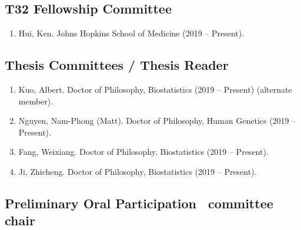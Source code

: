 \documentclass[10pt]{article}
\newcommand{\dn}[1]{{\color{black} {#1}}}
\newcommand{\myben}[1]{\smallskip\begin{enumerate}[start=1,label={\scriptsize \arabic*$\ $},leftmargin=\parindent]\setlength{\itemsep}{#1}\vspace*{-0.7em}}
\newcommand{\ee}{\end{enumerate}}
\newcommand{\mylift}[1]{\vspace*{#1}}
\begin{document}









\mylift{-1.5em}

\subsection*{T32 Fellowship Committee}

\myben{-0.1em}

\item Hui, Ken. Johns Hopkins School of Medicine (2019 -- Present).

\ee

\mylift{-1.5em}

\subsection*{Thesis Committees / Thesis Reader}

\myben{-0.1em}

\item \dn{Kuo}, Albert. Doctor of Philosophy, Biostatistics (2019 -- Present) (alternate member).
\item \dn{Nguyen}, Nam-Phong (Matt). Doctor of Philosophy, Human Genetics (2019 -- Present).
\item \dn{Fang}, Weixiang. Doctor of Philosophy, Biostatistics (2019 -- Present).
\item \dn{Ji}, Zhicheng. Doctor of Philosophy, Biostatistics (2019 -- Present).

\ee

\mylift{-1.5em}

\subsection*{Preliminary Oral Participation \ \tiny * committee chair}
\end{document}
